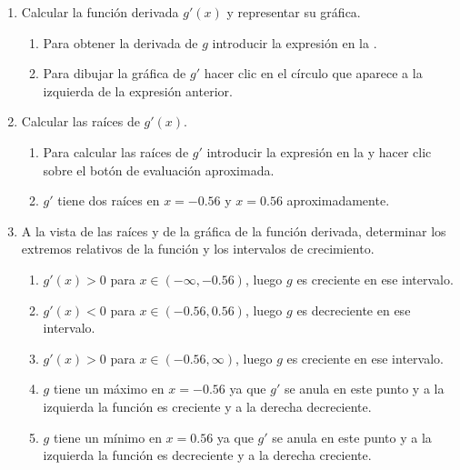 \begin{enumerate}[leftmargin=*]
\begin{enumerate}
      \item Calcular la función derivada $g'(x)$ y representar su gráfica.
            \begin{indication}
            \begin{enumerate}
            \item Para obtener la derivada de $g$ introducir la expresión  en la .
            \item Para dibujar la gráfica de $g'$ hacer clic en el círculo que aparece a la izquierda de la expresión anterior.
            \end{enumerate}
            \end{indication}

      \item Calcular las raíces de $g'(x).$
            \begin{indication}
            \begin{enumerate}
            \item Para calcular las raíces de $g'$ introducir la expresión  en la  y hacer clic sobre el botón de evaluación aproximada.
            \item $g'$ tiene dos raíces en $x=-0.56$ y $x=0.56$ aproximadamente.
            \end{enumerate}
            \end{indication}

      \item  A la vista de las raíces y de la gráfica de la función derivada, determinar los extremos relativos de la función y los intervalos de crecimiento.
            \begin{indication}
            \begin{enumerate}
            \item $g'(x)>0$ para $x\in (-\infty, -0.56)$, luego $g$ es creciente en ese intervalo.
            \item $g'(x)<0$ para $x\in (-0.56, 0.56)$, luego $g$ es decreciente en ese intervalo.
            \item $g'(x)>0$ para $x\in (-0.56, \infty)$, luego $g$ es creciente en ese intervalo.
            \item $g$ tiene un máximo en $x=-0.56$ ya que $g'$ se anula en este punto y a la izquierda la función es creciente y a la derecha decreciente.
            \item $g$ tiene un mínimo en $x=0.56$ ya que $g'$ se anula en este punto y a la izquierda la función es decreciente y a la derecha creciente.
            \end{enumerate}
            \end{indication}


\end{enumerate}
\end{enumerate}
